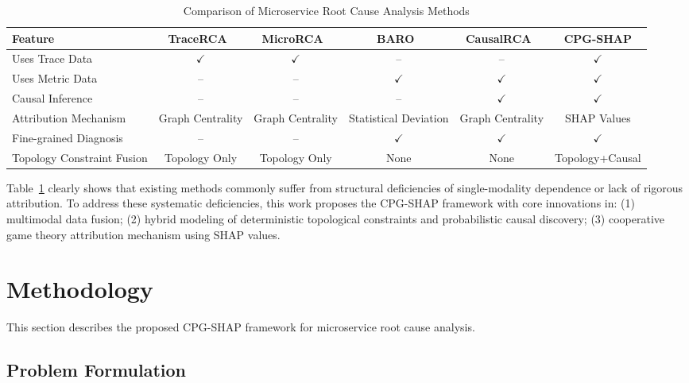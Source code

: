 \documentclass[conference]{IEEEtran}
\begin{document}
\begin{table}[htbp]
    \centering
    \caption{Comparison of Microservice Root Cause Analysis Methods}
    \label{tab:method_compare}
    \footnotesize
    \begin{tabular}{lccccc}
        \toprule
        \textbf{Feature} & \textbf{TraceRCA~\cite{tracerca}} & \textbf{MicroRCA~\cite{microrca}} & \textbf{BARO~\cite{baro2023}} & \textbf{CausalRCA~\cite{causalrca}} & \textbf{CPG-SHAP} \\
        \midrule
        Uses Trace Data & $\checkmark$ & $\checkmark$ & -- & -- & $\checkmark$ \\
        Uses Metric Data & -- & -- & $\checkmark$ & $\checkmark$ & $\checkmark$ \\
        Causal Inference & -- & -- & -- & $\checkmark$ & $\checkmark$ \\
        Attribution Mechanism & Graph Centrality & Graph Centrality & Statistical Deviation & Graph Centrality & SHAP Values \\
        Fine-grained Diagnosis & -- & -- & $\checkmark$ & $\checkmark$ & $\checkmark$ \\
        Topology Constraint Fusion & Topology Only & Topology Only & None & None & Topology+Causal \\
        \bottomrule
    \end{tabular}
\end{table}

Table~\ref{tab:method_compare} clearly shows that existing methods commonly suffer from structural deficiencies of single-modality dependence or lack of rigorous attribution. To address these systematic deficiencies, this work proposes the CPG-SHAP framework with core innovations in: (1) multimodal data fusion; (2) hybrid modeling of deterministic topological constraints and probabilistic causal discovery; (3) cooperative game theory attribution mechanism using SHAP values.

\section{Methodology}

This section describes the proposed CPG-SHAP framework for microservice root cause analysis.

\subsection{Problem Formulation}
\end{document}
